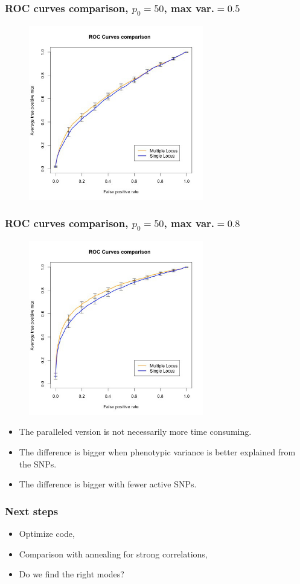 \documentclass{beamer}
\begin{document}
\begin{frame}
\frametitle{ROC curves comparison, $p_0 = 50$, max var.$=0.5$}
\begin{figure}
\includegraphics[width=3in]{images/ROC_Comp_p0_50_var_0_5.jpeg}
\end{figure}
\end{frame}
\begin{frame}
\frametitle{ROC curves comparison, $p_0 = 50$, max var.$=0.8$}
\begin{figure}
\includegraphics[width=3in]{images/ROC_Comp_p0_50_var_0_8.jpeg}
\end{figure}
\end{frame}

\begin{frame}
\begin{itemize}
\item The paralleled version is not necessarily more time consuming.
\item The difference is bigger when phenotypic variance is better explained from the SNPs.
\item The difference is bigger with fewer active SNPs.
\end{itemize}
\end{frame}

\begin{frame}
\frametitle{Next steps}
\begin{itemize}
\item Optimize code,
\item Comparison with annealing for strong correlations,
\item Do we find the right modes?

\end{itemize}
\end{frame}
\end{document}
